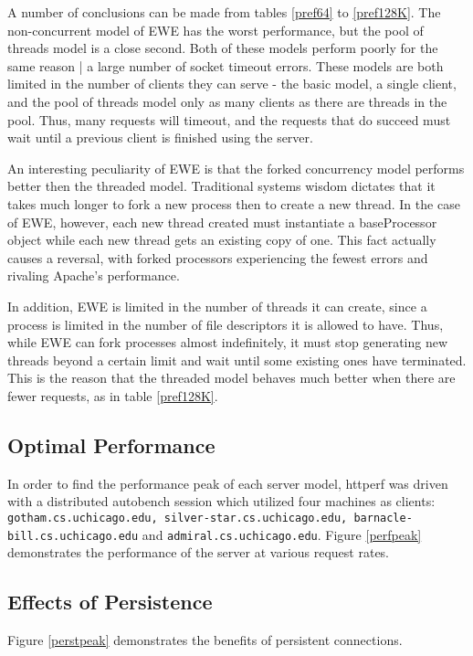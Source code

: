 \documentclass{article}
\begin{document}
A number of conclusions can be made from tables \ref{pref64} to \ref{pref128K}.
The non-concurrent model of EWE has the worst performance, but the pool of threads model is a close second.
Both of these models perform poorly for the same reason | a large number of socket timeout errors.
These models are both limited in the number of clients they can serve - the basic model, a single client, and the pool of threads model only as many clients as there are threads in the pool.
Thus, many requests will timeout, and the requests that do succeed must wait until a previous client is finished using the server.

An interesting peculiarity of EWE is that the forked concurrency model performs better then the threaded model.
Traditional systems wisdom dictates that it takes much longer to fork a new process then to create a new thread.
In the case of EWE, however, each new thread created must instantiate a baseProcessor object while each new thread gets an existing copy of one.
This fact actually causes a reversal, with forked processors experiencing the fewest errors and rivaling Apache's performance.

In addition, EWE is limited in the number of threads it can create, since a process is limited in the number of file descriptors it is allowed to have.
Thus, while EWE can fork processes almost indefinitely, it must stop generating new threads beyond a certain limit and wait until some existing ones have terminated.
This is the reason that the threaded model behaves much better when there are fewer requests, as in table \ref{pref128K}.

\subsection{Optimal Performance}
In order to find the performance peak of each server model, httperf was driven with a distributed autobench session which utilized four machines as clients: \texttt{gotham.cs.uchicago.edu, silver-star.cs.uchicago.edu, barnacle-bill.cs.uchicago.edu} and \texttt{admiral.cs.uchicago.edu}.  Figure \ref{perfpeak} demonstrates the performance of the server at various request rates.

\subsection{Effects of Persistence}\label{perstPerf}
Figure \ref{perstpeak} demonstrates the benefits of persistent connections.
\end{document}
